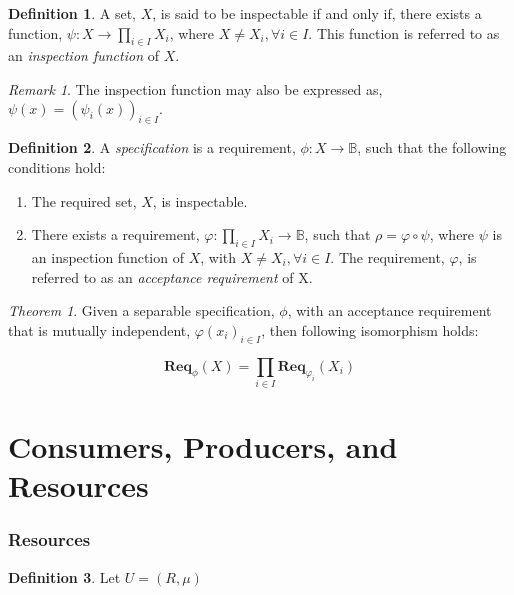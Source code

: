 \documentclass{article}
\theoremstyle{definition}
\newtheorem{definition}{Definition}[section]
\theoremstyle{remark}
\newtheorem*{remark}{Remark}
\newtheorem*{theorem}{Theorem}
\newcommand{\func}[3]{#1:#2\rightarrow#3}
\newcommand{\reqfunc}[2]{#1:#2\rightarrow\mathbb{B}}
\newcommand{\reqop}[2]{\mathbf{Req}_{#1}(#2)}
\begin{document}
		\begin{definition}
			A set, $X$, is said to be inspectable if and only if, there exists a function, $\func{\psi}{X}{\prod_{i \in I}{X_{i}}}$, where $X \ne X_{i}, \forall i \in I$. This function is referred to as an \emph{inspection function} of $X$.
		\end{definition}
		
		\begin{remark}
			The inspection function may also be expressed as, $\psi(x) = (\psi_{i}(x))_{i \in I}.$
		\end{remark}
		
		\begin{definition}
			A \emph{specification} is a requirement, $\reqfunc{\phi}{X}$, such that the following conditions
			hold:
			
			\begin{enumerate}
				\item   The required set, $X$, is inspectable.
				
				\item   There exists a requirement, $\reqfunc{\varphi}{\prod_{i \in I}{X_{i}}}$,
				such that $\rho = \varphi \circ \psi$, where $\psi$ is an inspection function of $X$,
				with $X \ne X_{i}, \forall i \in I$. The requirement, $\varphi$, is referred to as an
				\emph{acceptance requirement} of X.
			\end{enumerate}
			
		\end{definition}
		
		\begin{theorem}
			Given a separable specification, $\phi$, with an acceptance requirement that is mutually independent,
			$\varphi(x_i)_{i \in I}$, then following isomorphism holds:
			
			\[
			\reqop{\phi}{X} = \prod_{i \in I}\reqop{\varphi_{i}}{X_{i}}
			\]
		\end{theorem}
	
	\newpage
	
	\part{Consumers, Producers, and Resources}
	
	\section{Resources}
	
		\begin{definition}
			Let $U = (R, \mu)$
		\end{definition}
		
\end{document}

